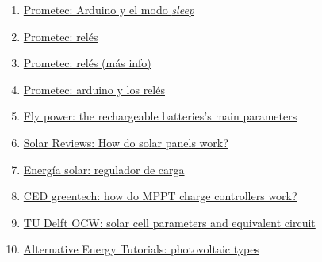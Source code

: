\documentclass[12pt]{article}
\begin{document}
\begin{enumerate}
			\item 
			\label{bib: prometec modo sleep arduino}
			\href{https://www.prometec.net/el-modo-sleep-en-arduino/}{Prometec: Arduino y el modo \textit{sleep}}
			
			\item 
			\label{bib: prometec relés}
			\href{https://www.prometec.net/reles-s4a/}{Prometec: relés}
			
			\item 
			\label{bib: prometec relés (más info)}
			\href{https://www.prometec.net/mas-sobre-reles/}{Prometec: relés (más info)}
			
			\item 
			\label{bib: prometec relés y arduino}
			\href{https://www.prometec.net/reles/}{Prometec: arduino y los relés}
			
			\item 
			\label{bib: fly power rechargeable battery param}
			\href{https://fly-power.com/en/battery-knowledge/item/2-rechargeable-batteries-s-main-parameters}{Fly power: the rechargeable batteries's main parameters}
			
			\item 
			\label{bib: solar reviews how solar panels work}
			\href{https://www.solarreviews.com/blog/how-do-solar-panels-work}{Solar Reviews: How do solar panels work?}
			
			\item 
			\label{bib: energia solar regulador de carga}
			\href{https://solar-energia.net/energia-solar-fotovoltaica/elementos/instalaciones-autonomas/reguladores-carga}{Energía solar: regulador de carga}
			
			\item 
			\label{bib: CED greentech how mppt works}
			\href{https://www.cedgreentech.com/article/how-do-mppt-charge-controllers-work}{CED greentech: how do MPPT charge controllers work?}
			
			\item 
			\label{bib: TU delft OCW solar cell param}
			\href{https://ocw.tudelft.nl/wp-content/uploads/solar_energy_section_9_1_9_3.pdf}{TU Delft OCW: solar cell parameters and equivalent circuit}
			
			\item 
			\label{bib: alternative energy photovoltaic types}
			\href{https://www.alternative-energy-tutorials.com/photovoltaics/photovoltaic-types.html}{Alternative Energy Tutorials: photovoltaic types}
			

\end{enumerate}
\end{document}
